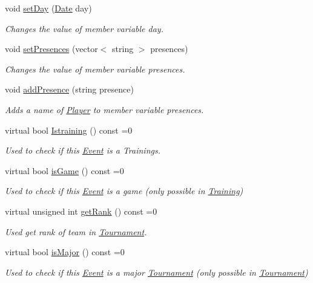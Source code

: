 \begin{DoxyCompactItemize}
void \hyperlink{class_event_a7e9fa73e721c69bdf05b894ec3178e9b}{set\+Day} (\hyperlink{class_date}{Date} day)
\begin{DoxyCompactList}\small\item\em Changes the value of member variable day. \end{DoxyCompactList}\item 
void \hyperlink{class_event_a2e63387b12ece5fc8b38c6b1142df219}{set\+Presences} (vector$<$ string $>$ presences)
\begin{DoxyCompactList}\small\item\em Changes the value of member variable presences. \end{DoxyCompactList}\item 
void \hyperlink{class_event_a3efb47d783affa24203f4ba13b355c56}{add\+Presence} (string presence)
\begin{DoxyCompactList}\small\item\em Adds a name of \hyperlink{class_player}{Player} to member variable presences. \end{DoxyCompactList}\item 
virtual bool \hyperlink{class_event_a08af9b350f32520dca26d552d6f415b2}{Istraining} () const =0
\begin{DoxyCompactList}\small\item\em Used to check if this \hyperlink{class_event}{Event} is a Trainings. \end{DoxyCompactList}\item 
virtual bool \hyperlink{class_event_add36e9739215f6744040c11de50b26b7}{is\+Game} () const =0
\begin{DoxyCompactList}\small\item\em Used to check if this \hyperlink{class_event}{Event} is a game (only possible in \hyperlink{class_training}{Training}) \end{DoxyCompactList}\item 
virtual unsigned int \hyperlink{class_event_ab267b8e94c78ca51636792d75101acb5}{get\+Rank} () const =0
\begin{DoxyCompactList}\small\item\em Used get rank of team in \hyperlink{class_tournament}{Tournament}. \end{DoxyCompactList}\item 
virtual bool \hyperlink{class_event_ad1a1a9cb471d664a2ca99effc102259b}{is\+Major} () const =0
\begin{DoxyCompactList}\small\item\em Used to check if this \hyperlink{class_event}{Event} is a major \hyperlink{class_tournament}{Tournament} (only possible in \hyperlink{class_tournament}{Tournament}) \end{DoxyCompactList}\item 

\end{DoxyCompactItemize}
